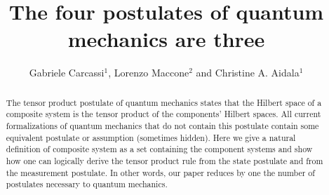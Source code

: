 \documentclass[aps,prl,amsmath,amssymb,twocolumn,nofootinbib]{revtex4}
\theoremstyle{plain}
\theoremstyle{definition}
\theoremstyle{remark}
\begin{document}
	
	\title{The four postulates of quantum mechanics are three}
	\author{Gabriele Carcassi$^1$, Lorenzo Maccone$^2$ and Christine A. Aidala$^1$
	}
	\begin{abstract}
		The tensor product postulate of quantum mechanics states that the
		Hilbert space of a composite system is the tensor product of the
		components' Hilbert spaces. All current formalizations of quantum
		mechanics that do not contain this postulate contain some equivalent
		postulate or assumption (sometimes hidden). Here we give a natural
		definition of composite system as a set containing the component
		systems and show how one can logically derive the tensor product
		rule from the state postulate and from the measurement postulate. In
		other words, our paper reduces by one the number of postulates
		necessary to quantum mechanics.
	\end{abstract}
	\pacs{}
	\maketitle
	
\end{document}
